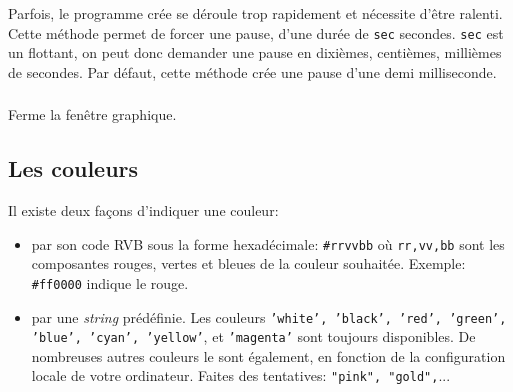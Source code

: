 \documentclass[11pt,a4paper]{article}
\begin{document}
\subsubsection*{}
Parfois, le programme crée se déroule trop rapidement et nécessite d'être ralenti. Cette méthode permet de forcer une pause, d'une durée de {\tt sec} secondes. {\tt sec} est un flottant, on peut donc demander une pause en dixièmes, centièmes, millièmes de secondes. Par défaut, cette méthode crée une pause d'une demi milliseconde.

\subsubsection*{}
Ferme la fenêtre graphique.



\subsection*{Les couleurs}
Il existe deux façons d'indiquer une couleur:
\begin{itemize}
  \item par son code RVB sous la forme hexadécimale: {\tt \#rrvvbb} où {\tt rr,vv,bb} sont les composantes rouges, vertes et bleues de la couleur souhaitée. Exemple: {\tt \#ff0000} indique le rouge.
  \item par une {\it string} prédéfinie. Les couleurs {\tt 'white', 'black', 'red', 'green', 'blue', 'cyan', 'yellow'}, et {\tt 'magenta'} sont toujours disponibles. De nombreuses autres couleurs le sont également, en fonction de la configuration locale de votre ordinateur. Faites des tentatives: {\tt "pink", "gold",}...
\end{itemize}
\end{document}
